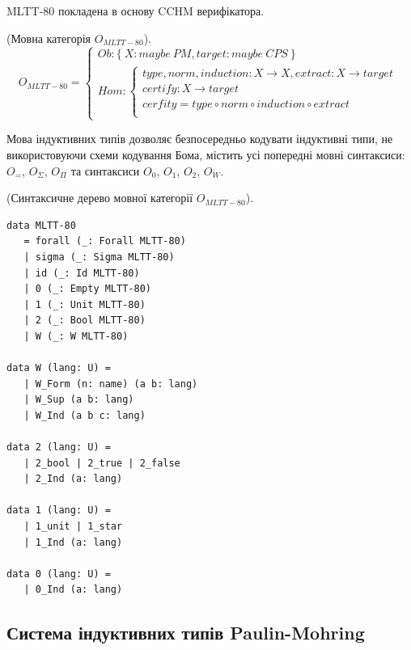 MLTT-80 покладена в основу CCHM верифікатора.

\begin{definition} (Мовна категорія $O_{MLTT-80}$).
\begin{equation}
O_{MLTT-80} =
\begin{cases}
Ob: \{\ X: maybe\ PM, target: maybe\ CPS\ \} \\
Hom: \begin{cases}
type,norm,induction: X \rightarrow X, extract: X \rightarrow target \\
certify : X \rightarrow target \\
cerfity = type \circ norm \circ induction \circ extract \\
\end{cases}
\end{cases}
\end{equation}
\end{definition}

Мова індуктивних типів дозволяє безпосередньо кодувати індуктивні типи,
не використовуючи схеми кодування Бома, містить усі попередні мовні синтаксиси:
$O_=$, $O_\Sigma$, $O_\Pi$ та синтаксиси $O_0$, $O_1$, $O_2$, $O_W$.

\begin{definition} (Синтаксичне дерево мовної категорії $O_{MLTT-80}$).
\begin{lstlisting}
data MLTT-80
   = forall (_: Forall MLTT-80)
   | sigma (_: Sigma MLTT-80)
   | id (_: Id MLTT-80)
   | 0 (_: Empty MLTT-80)
   | 1 (_: Unit MLTT-80)
   | 2 (_: Bool MLTT-80)
   | W (_: W MLTT-80)

data W (lang: U) =
   | W_Form (n: name) (a b: lang)
   | W_Sup (a b: lang)
   | W_Ind (a b c: lang)

data 2 (lang: U) =
   | 2_bool | 2_true | 2_false
   | 2_Ind (a: lang)

data 1 (lang: U) =
   | 1_unit | 1_star
   | 1_Ind (a: lang)

data 0 (lang: U) =
   | 0_Ind (a: lang)

\end{lstlisting}
\end{definition}

\newpage
\subsection{Система індуктивних типів Paulin-Mohring}

